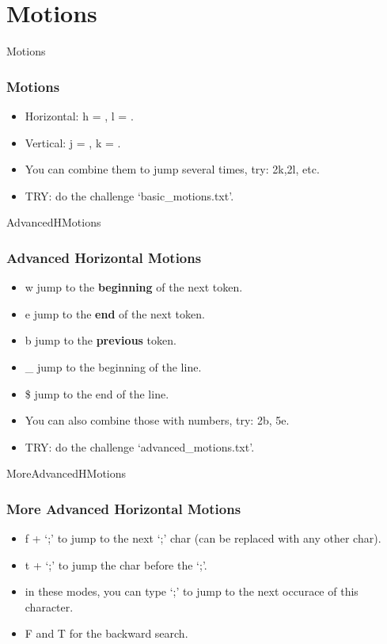 \documentclass{beamer}
\begin{document}
\section{Motions}
\begin{frame}{Motions}
    \frametitle{Motions}
    \begin{itemize}
        \item Horizontal: \textsf{h} = \leftarrow, \textsf{l} = \rightarrow.
        \item Vertical: \textsf{j} = \uparrow, \textsf{k} = \downarrow.
        \item You can combine them to jump several times, try: \textsf{2k},\textsf{2l}, etc.
        \item TRY: do the challenge `basic\_motions.txt'.
    \end{itemize}
\end{frame}

\begin{frame}{AdvancedHMotions}
    \frametitle{Advanced Horizontal Motions}
    \begin{itemize}
        \item \textsf{w} jump to the \textbf{beginning} of the next token.
        \item \textsf{e} jump to the \textbf{end} of the next token.
        \item \textsf{b} jump to the \textbf{previous} token.
        \item \textsf{\_} jump to the beginning of the line.
        \item \textsf{\$} jump to the end of the line.
        \item You can also combine those with numbers, try: \textsf{2b}, \textsf{5e}.
        \item TRY: do the challenge `advanced\_motions.txt'.
    \end{itemize}
\end{frame}

\begin{frame}{MoreAdvancedHMotions}
    \frametitle{More Advanced Horizontal Motions}
    \begin{itemize}
        \item \textsf{f} + `;' to jump to the next `;' char (can be replaced with any other char).
        \item \textsf{t} + `;' to jump the char before the `;'.
        \item in these modes, you can type `;' to jump to the next occurace of this character.
        \item \textsf{F} and \textsf{T} for the backward search.
    \end{itemize}
\end{frame}
\end{document}
